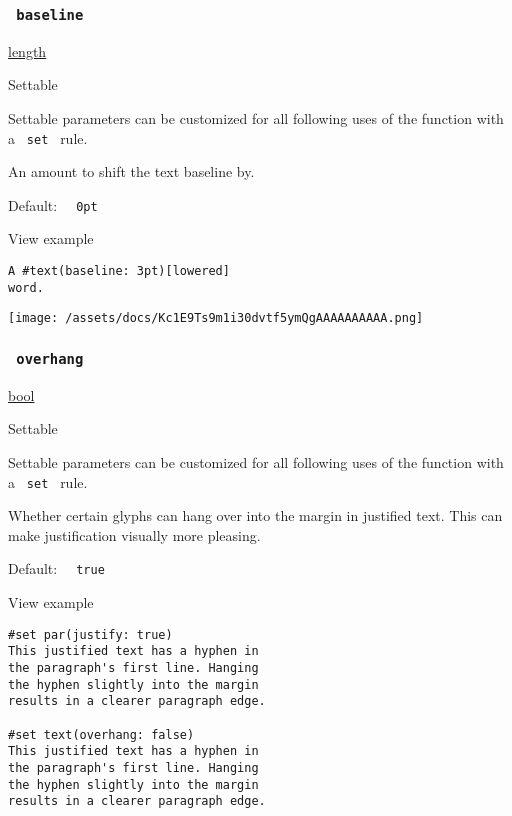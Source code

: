 \subsubsection{\texorpdfstring{\texttt{\ baseline\ }}{ baseline }}\label{parameters-baseline}

\href{/docs/reference/layout/length/}{length}

{{ Settable }}

\label{parameters-baseline-settable-tooltip}
Settable parameters can be customized for all following uses of the
function with a \texttt{\ set\ } rule.

An amount to shift the text baseline by.

Default: \texttt{\ }{\texttt{\ 0pt\ }}\texttt{\ }


View example

\begin{verbatim}
A #text(baseline: 3pt)[lowered]
word.
\end{verbatim}

\texttt{[image: /assets/docs/Kc1E9Ts9m1i30dvtf5ymQgAAAAAAAAAA.png]}

\subsubsection{\texorpdfstring{\texttt{\ overhang\ }}{ overhang }}\label{parameters-overhang}

\href{/docs/reference/foundations/bool/}{bool}

{{ Settable }}

\label{parameters-overhang-settable-tooltip}
Settable parameters can be customized for all following uses of the
function with a \texttt{\ set\ } rule.

Whether certain glyphs can hang over into the margin in justified text.
This can make justification visually more pleasing.

Default: \texttt{\ }{\texttt{\ true\ }}\texttt{\ }


View example

\begin{verbatim}
#set par(justify: true)
This justified text has a hyphen in
the paragraph's first line. Hanging
the hyphen slightly into the margin
results in a clearer paragraph edge.

#set text(overhang: false)
This justified text has a hyphen in
the paragraph's first line. Hanging
the hyphen slightly into the margin
results in a clearer paragraph edge.
\end{verbatim}

